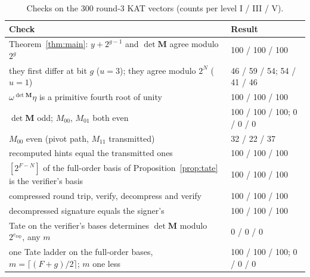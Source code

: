 \documentclass[version=preprint,notanonymous]{iacrcc}
\newcommand{\ers}{e_{\mathrm{rsp}}}
\newcommand{\Mm}{\mathbf{M}}
\begin{document}
\begin{table}[H]
\centering
\caption{Checks on the 300 round-3 KAT vectors (counts per level I / III
/ V).}
\label{tab:checked}
\footnotesize
\begin{tabular}{p{8.6cm} l}
\toprule
\textbf{Check} & \textbf{Result} \\
\midrule
Theorem~\ref{thm:main}: $y + 2^{g - 1}$ and $\det \Mm$ agree modulo $2^g$ & 100 / 100 / 100 \\
\quad they first differ at bit $g$ ($u = 3$); they agree modulo $2^N$ ($u = 1$) & 46 / 59 / 54; 54 / 41 / 46 \\
$\omega^{\det \Mm} \eta$ is a primitive fourth root of unity & 100 / 100 / 100 \\
$\det \Mm$ odd; $M_{00}$, $M_{01}$ both even & 100 / 100 / 100; 0 / 0 / 0 \\
$M_{00}$ even (pivot path, $M_{11}$ transmitted) & 32 / 22 / 37 \\
recomputed hints equal the transmitted ones & 100 / 100 / 100 \\
$[2^{F - N}]$ of the full-order basis of Proposition~\ref{prop:tate} is the verifier's basis & 100 / 100 / 100 \\
compressed round trip, verify, decompress and verify & 100 / 100 / 100 \\
decompressed signature equals the signer's & 100 / 100 / 100 \\
Tate on the verifier's bases determines $\det \Mm$ modulo $2^{\ers}$, any $m$ & 0 / 0 / 0 \\
one Tate ladder on the full-order bases, $m = \lceil (F + g)/2 \rceil$; $m$ one less & 100 / 100 / 100; 0 / 0 / 0 \\
\bottomrule
\end{tabular}
\end{table}


\end{document}
